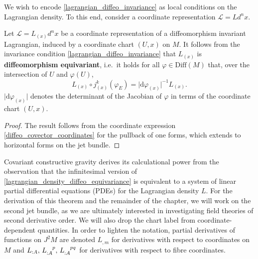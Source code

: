 We wish to encode \eqref{lagrangian_diffeo_invariance} as local conditions on the Lagrangian density. To this end, consider a coordinate representation $\mathscr L = Ld^nx$. 
\begin{proposition}
  Let $\mathscr L = L_{(x)}d^nx$ be a coordinate representation of a diffeomorphism invariant Lagrangian, induced by a coordinate chart $(U,x)$ on $M$. It follows from the invariance condition \eqref{lagrangian_diffeo_invariance} that $L_{(x)}$ is \textbf{diffeomorphism equivariant}, i.e.\ it holds for all $\varphi\in\mathrm{Diff}(M)$ that, over the intersection of $U$ and $\varphi(U)$,
  \begin{equation}\label{lagrangian_density_diffeo_equivariance}
    L_{(x)}\circ j^k_{(x)}(\varphi_E) = \lvert \mathrm d\varphi_{(x)}\rvert^{-1} L_{(x)}.
  \end{equation}
  $\lvert \mathrm d\varphi_{(x)}\rvert$ denotes the determinant of the Jacobian of $\varphi$ in terms of the coordinate chart $(U,x)$.
\end{proposition}
\begin{proof}
  The result follows from the coordinate expression \eqref{diffeo_covector_coordinates} for the pullback of one forms, which extends to horizontal forms on the jet bundle.
\end{proof}

Covariant constructive gravity derives its calculational power from the observation that the infinitesimal version of \eqref{lagrangian_density_diffeo_equivariance} is equivalent to a system of linear partial differential equations (PDEs) for the Lagrangian density $L$. For the derivation of this theorem and the remainder of the chapter, we will work on the second jet bundle, as we are ultimately interested in investigating field theories of second derivative order. We will also drop the chart label from coordinate-dependent quantities. In order to lighten the notation, partial derivatives of functions on $J^2M$ are denoted $L_{,m}$ for derivatives with respect to coordinates on $M$ and $L_{:A},\,L_{:A}^{\hphantom{:A}p},\,L_{:A}^{\hphantom{:A}pq}$ for derivatives with respect to fibre coordinates.

